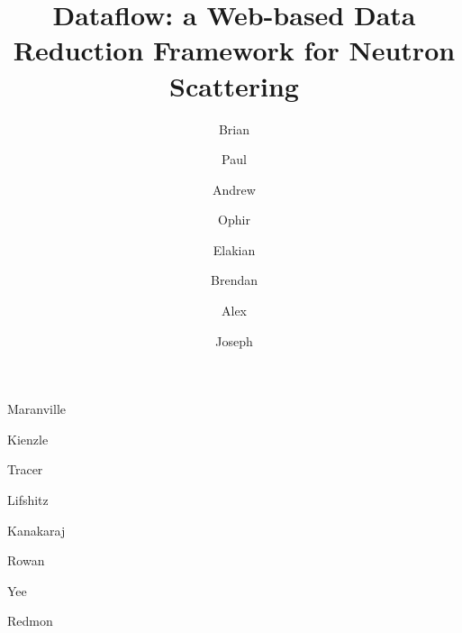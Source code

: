 \documentclass[pdf]{iucr}           %
\begin{document}



\title{Dataflow: a Web-based Data Reduction Framework for Neutron Scattering}


\author[a]{Brian}{Maranville}
\author[a]{Paul}{Kienzle}
\author[a,b]{Andrew}{Tracer}
\author[a]{Ophir}{Lifshitz}
\author[a]{Elakian}{Kanakaraj}
\author[a]{Brendan}{Rowan}
\author[a]{Alex}{Yee}
\author[a]{Joseph}{Redmon}








\end{document}
